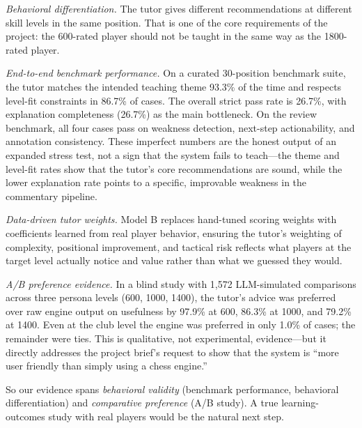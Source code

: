 \documentclass[11pt]{article}
\begin{document}
\emph{Behavioral differentiation.} The tutor gives different recommendations at different skill levels in the same position. That is one of the core requirements of the project: the 600-rated player should not be taught in the same way as the 1800-rated player.

\emph{End-to-end benchmark performance.} On a curated 30-position benchmark suite, the tutor matches the intended teaching theme 93.3\% of the time and respects level-fit constraints in 86.7\% of cases. The overall strict pass rate is 26.7\%, with explanation completeness (26.7\%) as the main bottleneck. On the review benchmark, all four cases pass on weakness detection, next-step actionability, and annotation consistency. These imperfect numbers are the honest output of an expanded stress test, not a sign that the system fails to teach---the theme and level-fit rates show that the tutor's core recommendations are sound, while the lower explanation rate points to a specific, improvable weakness in the commentary pipeline.

\emph{Data-driven tutor weights.} Model B replaces hand-tuned scoring weights with coefficients learned from real player behavior, ensuring the tutor's weighting of complexity, positional improvement, and tactical risk reflects what players at the target level actually notice and value rather than what we guessed they would.

\emph{A/B preference evidence.} In a blind study with 1{,}572 LLM-simulated comparisons across three persona levels (600, 1000, 1400), the tutor's advice was preferred over raw engine output on usefulness by 97.9\% at 600, 86.3\% at 1000, and 79.2\% at 1400. Even at the club level the engine was preferred in only 1.0\% of cases; the remainder were ties. This is qualitative, not experimental, evidence---but it directly addresses the project brief's request to show that the system is ``more user friendly than simply using a chess engine.''

So our evidence spans \emph{behavioral validity} (benchmark performance, behavioral differentiation) and \emph{comparative preference} (A/B study). A true learning-outcomes study with real players would be the natural next step.
\end{document}
